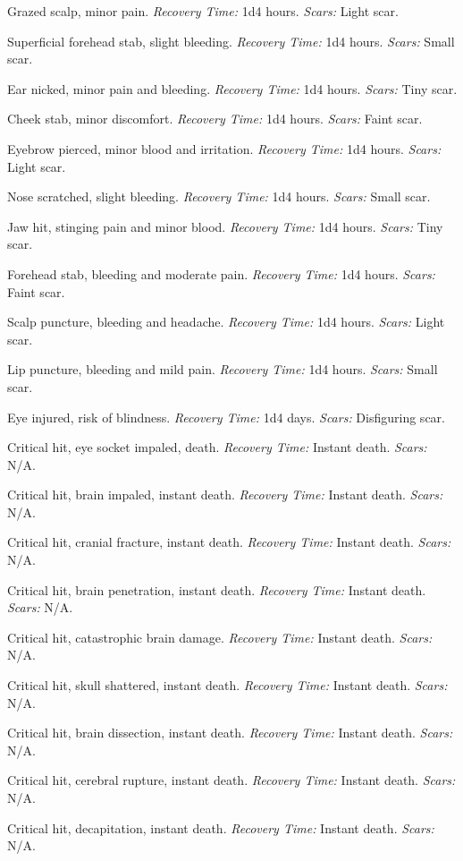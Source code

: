\documentclass[12pt]{book}
\begin{document}
\begin{description}[labelwidth=1.5em, leftmargin=*, itemsep=0.4em]
    \item[1 -] Grazed scalp, minor pain. \textit{Recovery Time:} 1d4 hours. \textit{Scars:} Light scar.
    \item[2 -] Superficial forehead stab, slight bleeding. \textit{Recovery Time:} 1d4 hours. \textit{Scars:} Small scar.
    \item[3 -] Ear nicked, minor pain and bleeding. \textit{Recovery Time:} 1d4 hours. \textit{Scars:} Tiny scar.
    \item[4 -] Cheek stab, minor discomfort. \textit{Recovery Time:} 1d4 hours. \textit{Scars:} Faint scar.
    \item[5 -] Eyebrow pierced, minor blood and irritation. \textit{Recovery Time:} 1d4 hours. \textit{Scars:} Light scar.
    \item[6 -] Nose scratched, slight bleeding. \textit{Recovery Time:} 1d4 hours. \textit{Scars:} Small scar.
    \item[7 -] Jaw hit, stinging pain and minor blood. \textit{Recovery Time:} 1d4 hours. \textit{Scars:} Tiny scar.
    \item[8 -] Forehead stab, bleeding and moderate pain. \textit{Recovery Time:} 1d4 hours. \textit{Scars:} Faint scar.
    \item[9 -] Scalp puncture, bleeding and headache. \textit{Recovery Time:} 1d4 hours. \textit{Scars:} Light scar.
    \item[10 -] Lip puncture, bleeding and mild pain. \textit{Recovery Time:} 1d4 hours. \textit{Scars:} Small scar.
    \item[11 -] Eye injured, risk of blindness. \textit{Recovery Time:} 1d4 days. \textit{Scars:} Disfiguring scar.
    \item[12 -] Critical hit, eye socket impaled, death. \textit{Recovery Time:} Instant death. \textit{Scars:} N/A.
    \item[13 -] Critical hit, brain impaled, instant death. \textit{Recovery Time:} Instant death. \textit{Scars:} N/A.
    \item[14 -] Critical hit, cranial fracture, instant death. \textit{Recovery Time:} Instant death. \textit{Scars:} N/A.
    \item[15 -] Critical hit, brain penetration, instant death. \textit{Recovery Time:} Instant death. \textit{Scars:} N/A.
    \item[16 -] Critical hit, catastrophic brain damage. \textit{Recovery Time:} Instant death. \textit{Scars:} N/A.
    \item[17 -] Critical hit, skull shattered, instant death. \textit{Recovery Time:} Instant death. \textit{Scars:} N/A.
    \item[18 -] Critical hit, brain dissection, instant death. \textit{Recovery Time:} Instant death. \textit{Scars:} N/A.
    \item[19 -] Critical hit, cerebral rupture, instant death. \textit{Recovery Time:} Instant death. \textit{Scars:} N/A.
    \item[20 -] Critical hit, decapitation, instant death. \textit{Recovery Time:} Instant death. \textit{Scars:} N/A.
\end{description}
\end{document}
